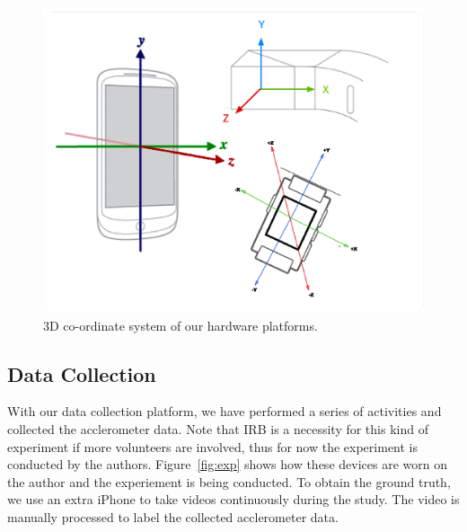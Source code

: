\begin{figure}
  \centering
  \includegraphics[width=0.9\columnwidth]{figures/coordinates.png}
  \caption{3D co-ordinate system of our hardware platforms.}
  \label{fig:coordinate}
\end{figure}

\subsection{Data Collection}
\label{sec:data-collection-2}

With our data collection platform, we have performed a series of activities and collected the acclerometer data. Note that IRB is a necessity for this kind of experiment if more volunteers are involved, thus for now the experiment is conducted by the authors. Figure~\ref{fig:exp} shows how these devices are worn on the author and the experiement is being conducted. To obtain the ground truth, we use an extra iPhone to take videos continuously during the study. The video is manually processed to label the collected acclerometer data.

